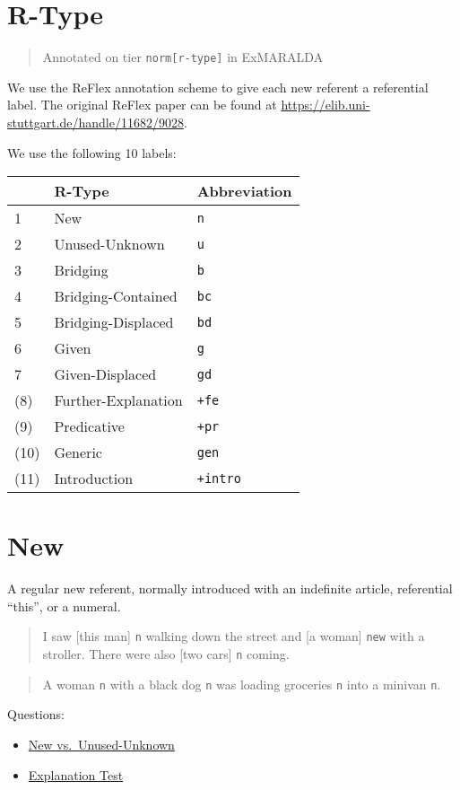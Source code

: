 \documentclass[
]{book}
\providecommand{\tightlist}{%
  \setlength{\itemsep}{0pt}\setlength{\parskip}{0pt}}
\begin{document}
\hypertarget{r-type}{%
\section{R-Type}\label{r-type}}

\begin{quote}
Annotated on tier \texttt{norm{[}r-type{]}} in ExMARALDA
\end{quote}

We use the ReFlex annotation scheme to give each new referent a referential label.
The original ReFlex paper can be found at \url{https://elib.uni-stuttgart.de/handle/11682/9028}.

We use the following 10 labels:

\begin{longtable}[]{@{}lll@{}}
\toprule
& R-Type & Abbreviation\tabularnewline
\midrule
\endhead
1 & New & \texttt{n}\tabularnewline
2 & Unused-Unknown & \texttt{u}\tabularnewline
3 & Bridging & \texttt{b}\tabularnewline
4 & Bridging-Contained & \texttt{bc}\tabularnewline
5 & Bridging-Displaced & \texttt{bd}\tabularnewline
6 & Given & \texttt{g}\tabularnewline
7 & Given-Displaced & \texttt{gd}\tabularnewline
(8) & Further-Explanation & \texttt{+fe}\tabularnewline
(9) & Predicative & \texttt{+pr}\tabularnewline
(10) & Generic & \texttt{gen}\tabularnewline
(11) & Introduction & \texttt{+intro}\tabularnewline
\bottomrule
\end{longtable}

\hypertarget{new}{%
\section{New}\label{new}}

A regular new referent, normally introduced with an indefinite article, referential ``this'', or a numeral.

\begin{quote}
I saw {[}this man{]} \texttt{n} walking down the street and {[}a woman{]} \texttt{new} with a stroller.
There were also {[}two cars{]} \texttt{n} coming.
\end{quote}

\begin{quote}
A woman \texttt{n} with a black dog \texttt{n} was loading groceries \texttt{n} into a minivan \texttt{n}.
\end{quote}

Questions:

\begin{itemize}
\tightlist
\item
  \protect\hyperlink{new-vs.-unused-unknown}{New vs.~Unused-Unknown}
\item
  \protect\hyperlink{referent-explanation-test}{Explanation Test}
\end{itemize}
\end{document}
